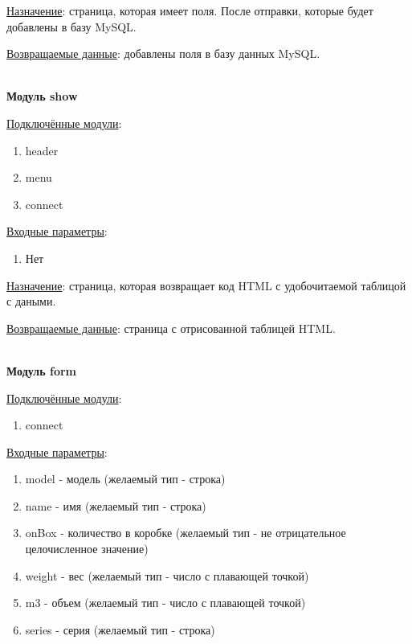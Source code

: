 \underline{Назначение}: страница, которая имеет поля. После отправки, которые будет добавлены в базу MySQL.

\underline{Возвращаемые данные}: добавлены поля в базу данных MySQL.

\hspace{0pt}\\


\textbf{Модуль show}

\underline{Подключённые модули}:

\begin{enumerate}
    \item header
    \item menu
    \item connect
\end{enumerate}

\underline{Входные параметры}:

\begin{enumerate}
    \item Нет
\end{enumerate}

\underline{Назначение}: страница, которая возвращает код HTML с удобочитаемой таблицой с даными.

\underline{Возвращаемые данные}: страница с отрисованной таблицей HTML.

\hspace{0pt}\\


\textbf{Модуль form}

\underline{Подключённые модули}:

\begin{enumerate}
    \item connect
\end{enumerate}

\underline{Входные параметры}:

\begin{enumerate}
    \item model - модель (желаемый тип - строка)
    \item name - имя (желаемый тип - строка)
    \item onBox - количество в коробке (желаемый тип - не отрицательное целочисленное значение)
    \item weight - вес (желаемый тип - число с плавающей точкой)
    \item m3 - объем (желаемый тип - число с плавающей точкой)     
    \item series - серия (желаемый тип - строка) 
\end{enumerate}

